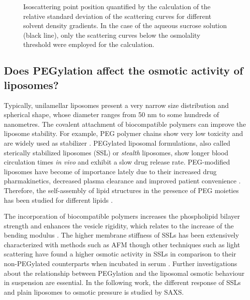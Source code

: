 \begin{figure}
	\centering
		
		\caption[Isoscattering point position of Caelyx with different solvents.]{Isoscattering point position quantified by the calculation of the relative standard deviation of the scattering curves for different solvent density gradients. In the case of the aqueous sucrose solution (black line), only the scattering curves below the osmolality threshold were employed for the calculation.}
		\label{fig:CaelyxIsopointComparison}
\end{figure}

\subsection{Does PEGylation affect the osmotic activity of liposomes?}
\label{sec:liposome_osmotic}

Typically, unilamellar liposomes present a very narrow size distribution and spherical shape, whose diameter ranges from 50 nm to some hundreds of nanometres. The covalent attachment of biocompatible polymers can improve the liposome stability. For example, PEG polymer chains show very low toxicity \citep{yamaoka_distribution_1994} and are widely used as stabilizer \citep{sou_polyethylene_2000}. PEGylated liposomal formulations, also called sterically stabilized liposomes (SSL) or \emph{stealth} liposomes, show longer blood circulation times \emph{in vivo} \citep{barenholz_liposome_2001} and exhibit a slow drug release rate. PEG-modified liposomes have become of importance lately due to their increased drug pharmakinetics, decreased plasma clearance and improved patient convenience \citep{gabizon_polyethylene_1997,harris_effect_2003}. Therefore, the self-assembly of lipid structures in the presence of PEG moieties has been studied for different lipids \citep{lee_coarse-grained_2011}.

The incorporation of biocompatible polymers increases the phospholipid bilayer strength and enhances the vesicle rigidity, which relates to the increase of the bending modulus \citep{liang_effect_2005, sou_polyethylene_2000}. The higher membrane stiffness of SSLs has been extensively characterized with methods such as AFM \citep{spyratou_atomic_2009} though other techniques such as light scattering have found a higher osmotic activity in SSLs in comparison to their non-PEGylated counterparts when incubated in serum \citep{wolfram_shrinkage_2014}. Further investigations about the relationship between PEGylation and the liposomal osmotic behaviour in suspension are essential. In the following work, the different response of SSLs and plain liposomes to osmotic pressure is studied by SAXS. 

